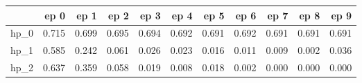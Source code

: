 \begin{tabular}{lrrrrrrrrrr}
\toprule
{} &   ep 0 &   ep 1 &   ep 2 &   ep 3 &   ep 4 &   ep 5 &   ep 6 &   ep 7 &   ep 8 &   ep 9 \\
\midrule
hp\_0 &  0.715 &  0.699 &  0.695 &  0.694 &  0.692 &  0.691 &  0.692 &  0.691 &  0.691 &  0.691 \\
hp\_1 &  0.585 &  0.242 &  0.061 &  0.026 &  0.023 &  0.016 &  0.011 &  0.009 &  0.002 &  0.036 \\
hp\_2 &  0.637 &  0.359 &  0.058 &  0.019 &  0.008 &  0.018 &  0.002 &  0.000 &  0.000 &  0.000 \\
\bottomrule
\end{tabular}
